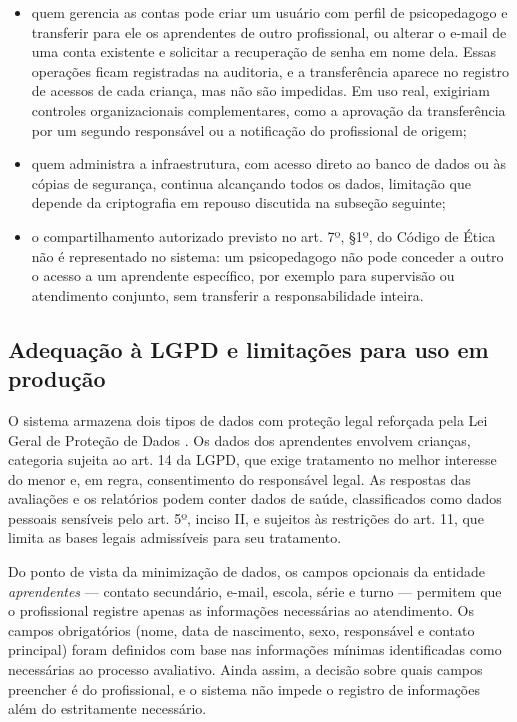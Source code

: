 \begin{itemize}
    \item quem gerencia as contas pode criar um usuário com perfil de psicopedagogo e transferir para ele os aprendentes de outro profissional, ou alterar o e-mail de uma conta existente e solicitar a recuperação de senha em nome dela. Essas operações ficam registradas na auditoria, e a transferência aparece no registro de acessos de cada criança, mas não são impedidas. Em uso real, exigiriam controles organizacionais complementares, como a aprovação da transferência por um segundo responsável ou a notificação do profissional de origem;
    \item quem administra a infraestrutura, com acesso direto ao banco de dados ou às cópias de segurança, continua alcançando todos os dados, limitação que depende da criptografia em repouso discutida na subseção seguinte;
    \item o compartilhamento autorizado previsto no art. 7º, §1º, do Código de Ética não é representado no sistema: um psicopedagogo não pode conceder a outro o acesso a um aprendente específico, por exemplo para supervisão ou atendimento conjunto, sem transferir a responsabilidade inteira.
\end{itemize}

\subsection{Adequação à LGPD e limitações para uso em produção}

O sistema armazena dois tipos de dados com proteção legal reforçada pela Lei Geral de Proteção de Dados \cite{brasil2018_lgpd}. Os dados dos aprendentes envolvem crianças, categoria sujeita ao art. 14 da LGPD, que exige tratamento no melhor interesse do menor e, em regra, consentimento do responsável legal. As respostas das avaliações e os relatórios podem conter dados de saúde, classificados como dados pessoais sensíveis pelo art. 5º, inciso II, e sujeitos às restrições do art. 11, que limita as bases legais admissíveis para seu tratamento.

Do ponto de vista da minimização de dados, os campos opcionais da entidade \textit{aprendentes} — contato secundário, e-mail, escola, série e turno — permitem que o profissional registre apenas as informações necessárias ao atendimento. Os campos obrigatórios (nome, data de nascimento, sexo, responsável e contato principal) foram definidos com base nas informações mínimas identificadas como necessárias ao processo avaliativo. Ainda assim, a decisão sobre quais campos preencher é do profissional, e o sistema não impede o registro de informações além do estritamente necessário.

